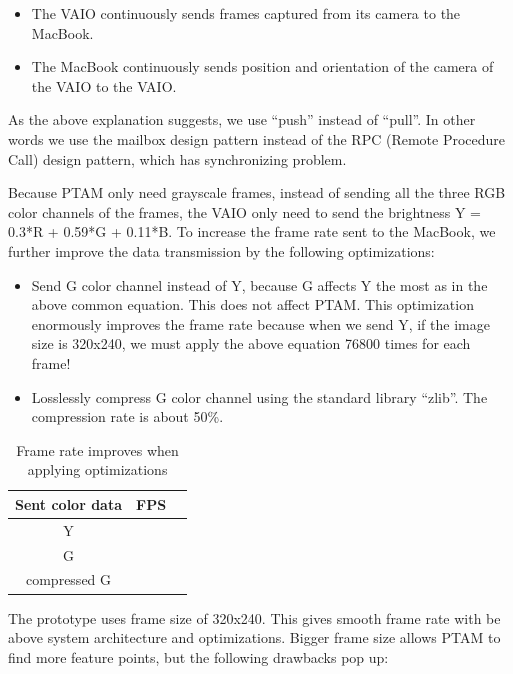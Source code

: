 \begin{itemize}
	\item The VAIO continuously sends frames captured from its camera to the MacBook.
	\item The MacBook continuously sends position and orientation of the camera of the VAIO to the VAIO.
\end{itemize}

As the above explanation suggests, we use ``push'' instead of ``pull''. In other words we use the mailbox design pattern instead of the RPC (Remote Procedure Call) design pattern, which has synchronizing problem.

Because PTAM only need grayscale frames, instead of sending all the three RGB color channels of the frames, the VAIO only need to send the brightness Y = 0.3*R + 0.59*G + 0.11*B. To increase the frame rate sent to the MacBook, we further improve the data transmission by the following optimizations:

\begin{itemize}
	\item Send G color channel instead of Y, because G affects Y the most as in the above common equation. This does not affect PTAM. This optimization enormously improves the frame rate because when we send Y, if the image size is 320x240, we must apply the above equation 76800 times for each frame!
	\item Losslessly compress G color channel using the standard library ``zlib''. The compression rate is about 50\%.
\end{itemize}

\begin{table}[tb]
	\begin{center}
		\begin{tabular}{|c|l|l|}
			\hline
			Sent color data & FPS \\
			\hline
			Y               &     \\
			G               &     \\
			compressed G    &     \\
			\hline
		\end{tabular}
		\caption{Frame rate improves when applying optimizations}
	\end{center}
\end{table}

The prototype uses frame size of 320x240. This gives smooth frame rate with be above system architecture and optimizations. Bigger frame size allows PTAM to find more feature points, but the following drawbacks pop up:

